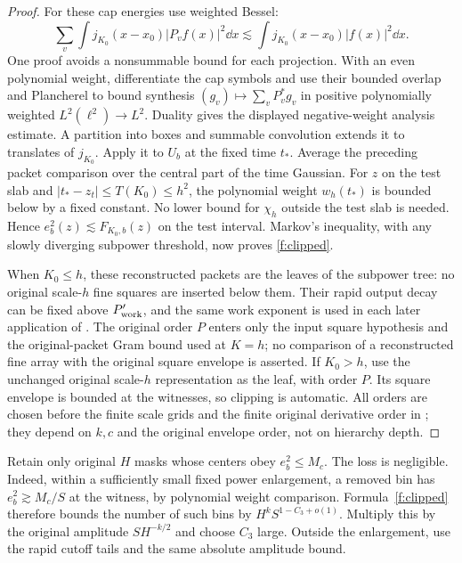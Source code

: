 \begin{proof}
For these cap energies use weighted Bessel:
\[
 \sum_v\int j_{K_0}(x-x_0)|P_vf(x)|^2\dd x
       \lesssim\int j_{K_0}(x-x_0)|f(x)|^2\dd x.
\]
One proof avoids a nonsummable bound for each projection. With an
even polynomial weight, differentiate the cap symbols and use their
bounded overlap and Plancherel to bound synthesis
$(g_v)\mapsto\sum_vP_v^*g_v$ in positive polynomially weighted
$L^2(\ell^2)\to L^2$. Duality gives the displayed negative-weight
analysis estimate. A partition into boxes and summable convolution
extends it to translates of $j_{K_0}$. Apply it to $U_b$ at the fixed
time $t_*$. Average the preceding packet comparison over the central
part of the time Gaussian. For $z$ on the test slab and
$|t_*-z_t|\le T(K_0)\le h^2$, the polynomial weight $w_h(t_*)$ is
bounded below by a fixed constant. No lower bound for $\chi_h$ outside
the test slab is needed. Hence
$e_b^2(z)\lesssim F_{K_0,b}(z)$ on the test interval. Markov's
inequality, with any slowly diverging subpower threshold, now proves
\eqref{f:clipped}.

When $K_0\le h$, these reconstructed packets are the leaves of the
subpower tree: no original scale-$h$ fine squares are inserted below
them. Their rapid output decay can be fixed above $P'_{\rm work}$,
and the same work exponent is used in each later application of
. The original order $P$
enters only the input square hypothesis and the original-packet Gram
bound used at $K=h$; no comparison of a reconstructed fine array
with the original square envelope is asserted. If $K_0>h$, use the
unchanged original scale-$h$ representation as the leaf, with order
$P$. Its square envelope is bounded at the witnesses, so clipping is
automatic. All orders are chosen before the finite scale grids and
the finite original derivative order in ; they depend
on $k,c$ and the original envelope order, not on hierarchy depth.
\end{proof}

Retain only original $H$ masks whose centers obey $e_b^2\le M_c$.
The loss is negligible. Indeed, within a sufficiently small fixed
power enlargement, a removed bin has $e_b^2\gtrsim M_c/S$ at the
witness, by polynomial weight comparison. Formula~\eqref{f:clipped}
therefore bounds the number of such bins by
$H^kS^{1-C_3+o(1)}$. Multiply this by the original amplitude
$SH^{-k/2}$ and choose $C_3$ large. Outside the enlargement, use the
rapid cutoff tails and the same absolute amplitude bound.

